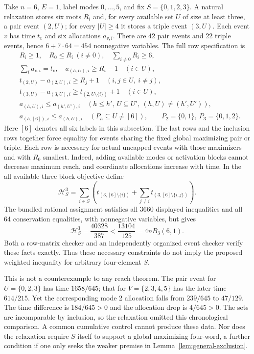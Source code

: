 Take $n=6$, $E=1$, label modes $0,\ldots,5$, and fix $S=\{0,1,2,3\}$.
A natural relaxation stores six roots $R_i$ and, for every available set
$U$ of size at least three, a pair event $(2,U)$; for every $|U|\ge4$
it stores a triple event $(3,U)$. Each event $v$ has time $t_v$ and
six allocations $a_{v,i}$. There are 42 pair events and 22 triple events,
hence $6+7\cdot64=454$ nonnegative variables. The full row specification is
\begin{align*}
 &R_i\ge1,\quad R_0\le R_i\ (i\ne0),\quad\sum_{i\ne0}R_i\ge6,\\
 &\sum_i a_{v,i}=t_v,\quad a_{(h,U),i}\ge R_i-1\quad(i\in U),\\
 &t_{(2,U)}-a_{(2,U),i}\ge R_j+1\quad(i,j\in U,\ i\ne j),\\
 &t_{(3,U)}-a_{(3,U),i}\ge t_{(2,U\setminus\{i\})}+1\quad(i\in U),\\
 &a_{(h,U),i}\le a_{(h',U'),i}
       \quad(h\le h',\ U\subseteq U',\ (h,U)\ne(h',U')),\\
 &a_{(h,[6]),i}\le a_{(h,U),i}
       \quad(P_h\subseteq U\ne[6]),
       \qquad P_2=\{0,1\},\ P_3=\{0,1,2\}.
\end{align*}
Here $[6]$ denotes all six labels in this subsection. The last rows and
the inclusion rows together force equality for events sharing the fixed
global maximizing pair or triple. Each row is necessary for actual
uncapped events with those maximizers and with $R_0$ smallest. Indeed,
adding available modes or activation blocks cannot decrease maximum reach,
and coordinate allocations increase with time. In the all-available
three-block objective define
\[
 \mathcal H_S^3=\sum_{i\in S}\left(t_{(3,[6]\setminus\{i\})}
               +\sum_{j\ne i}t_{(3,[6]\setminus\{i,j\})}\right).
\]
The bundled rational assignment satisfies all 3660 displayed inequalities
and all 64 conservation equalities, with nonnegative variables, but gives
\begin{equation}\label{eq:negative-event-objective}
 \mathcal H_S^3=\frac{40328}{387}<\frac{13104}{125}=4nB_3(6,1).
\end{equation}
Both a row-matrix checker and an independently organized event checker
verify these facts exactly. Thus these necessary constraints do not imply
the proposed weighted inequality for arbitrary four-element $S$.

This is not a counterexample to any reach theorem. The pair event for
$U=\{0,2,3\}$ has time $1658/645$; that for $V=\{2,3,4,5\}$ has
the later time $614/215$. Yet the corresponding mode 2 allocation falls
from $239/645$ to $47/129$. The time difference is $184/645>0$ and
the allocation drop is $4/645>0$. The sets are incomparable by inclusion,
so the relaxation omitted this chronological comparison. A common
cumulative control cannot produce these data. Nor does the relaxation
require $S$ itself to support a global maximizing four-word, a further
condition if one only seeks the weaker premise in
Lemma~\ref{lem:general-exclusion}.

